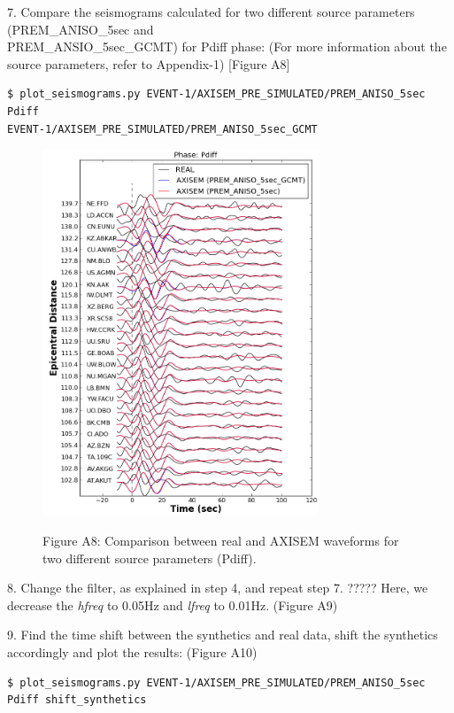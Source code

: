 \documentclass{article}
\begin{document}
7. Compare the seismograms calculated for two different source parameters (PREM\_ANISO\_5sec and \\
PREM\_ANSIO\_5sec\_GCMT) for Pdiff phase: (For more information about the source 
parameters, refer to Appendix-1) [Figure A8]

\begin{verbatim}
$ plot_seismograms.py EVENT-1/AXISEM_PRE_SIMULATED/PREM_ANISO_5sec Pdiff 
EVENT-1/AXISEM_PRE_SIMULATED/PREM_ANISO_5sec_GCMT
\end{verbatim}

\begin{figure}
\centering
\includegraphics[width=234pt, height=310pt, keepaspectratio=true]{AXISEMTutorial-fig014.png}
\begin{center}
{\small{}Figure A8: Comparison between real and AXISEM waveforms for two different 
source parameters (Pdiff).}
\end{center}
\end{figure}

8. Change the filter, as explained in step 4, and repeat step 7. ????? Here, we decrease 
the \textit{hfreq} to 0.05Hz and \textit{lfreq} to 0.01Hz. (Figure A9)

9. Find the time shift between the synthetics and real data, shift the synthetics 
accordingly and plot the results: (Figure A10)

\begin{verbatim}
$ plot_seismograms.py EVENT-1/AXISEM_PRE_SIMULATED/PREM_ANISO_5sec Pdiff shift_synthetics
\end{verbatim}
\end{document}

